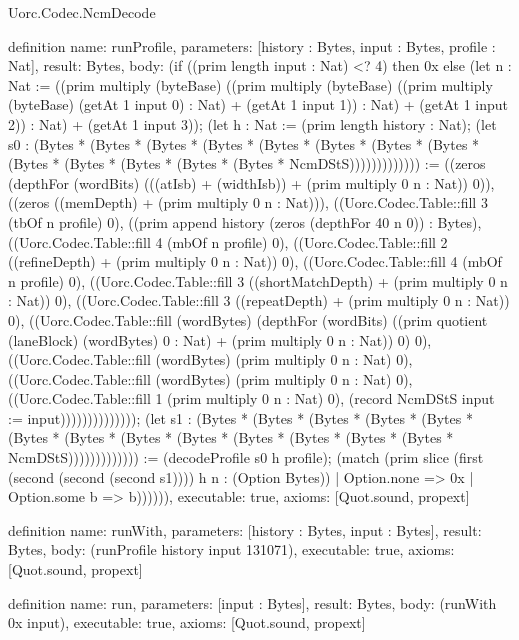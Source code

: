 \begin{lexlean}{Uorc.Codec.NcmDecode}
\begin{semanticmodule}
definition{
  name: runProfile,
  parameters: [history : Bytes, input : Bytes, profile : Nat],
  result: Bytes,
  body: (if ((prim length input : Nat) <? 4) then 0x else (let n : Nat := ((prim multiply (byteBase) ((prim multiply (byteBase) ((prim multiply (byteBase) (getAt 1 input 0) : Nat) + (getAt 1 input 1)) : Nat) + (getAt 1 input 2)) : Nat) + (getAt 1 input 3)); (let h : Nat := (prim length history : Nat); (let s0 : (Bytes * (Bytes * (Bytes * (Bytes * (Bytes * (Bytes * (Bytes * (Bytes * (Bytes * (Bytes * (Bytes * (Bytes * (Bytes * NcmDStS))))))))))))) := ((zeros (depthFor (wordBits) (((atIsb) + (widthIsb)) + (prim multiply 0 n : Nat)) 0)), ((zeros ((memDepth) + (prim multiply 0 n : Nat))), ((Uorc.Codec.Table::fill 3 (tbOf n profile) 0), ((prim append history (zeros (depthFor 40 n 0)) : Bytes), ((Uorc.Codec.Table::fill 4 (mbOf n profile) 0), ((Uorc.Codec.Table::fill 2 ((refineDepth) + (prim multiply 0 n : Nat)) 0), ((Uorc.Codec.Table::fill 4 (mbOf n profile) 0), ((Uorc.Codec.Table::fill 3 ((shortMatchDepth) + (prim multiply 0 n : Nat)) 0), ((Uorc.Codec.Table::fill 3 ((repeatDepth) + (prim multiply 0 n : Nat)) 0), ((Uorc.Codec.Table::fill (wordBytes) (depthFor (wordBits) ((prim quotient (laneBlock) (wordBytes) 0 : Nat) + (prim multiply 0 n : Nat)) 0) 0), ((Uorc.Codec.Table::fill (wordBytes) (prim multiply 0 n : Nat) 0), ((Uorc.Codec.Table::fill (wordBytes) (prim multiply 0 n : Nat) 0), ((Uorc.Codec.Table::fill 1 (prim multiply 0 n : Nat) 0), (record NcmDStS {input := input})))))))))))))); (let s1 : (Bytes * (Bytes * (Bytes * (Bytes * (Bytes * (Bytes * (Bytes * (Bytes * (Bytes * (Bytes * (Bytes * (Bytes * (Bytes * NcmDStS))))))))))))) := (decodeProfile s0 h profile); (match (prim slice (first (second (second (second s1)))) h n : (Option Bytes))
    | Option.none => 0x
    | Option.some b => b)))))),
  executable: true,
  axioms: [Quot.sound, propext]
}

definition{
  name: runWith,
  parameters: [history : Bytes, input : Bytes],
  result: Bytes,
  body: (runProfile history input 131071),
  executable: true,
  axioms: [Quot.sound, propext]
}

definition{
  name: run,
  parameters: [input : Bytes],
  result: Bytes,
  body: (runWith 0x input),
  executable: true,
  axioms: [Quot.sound, propext]
}


\end{semanticmodule}
\end{lexlean}
